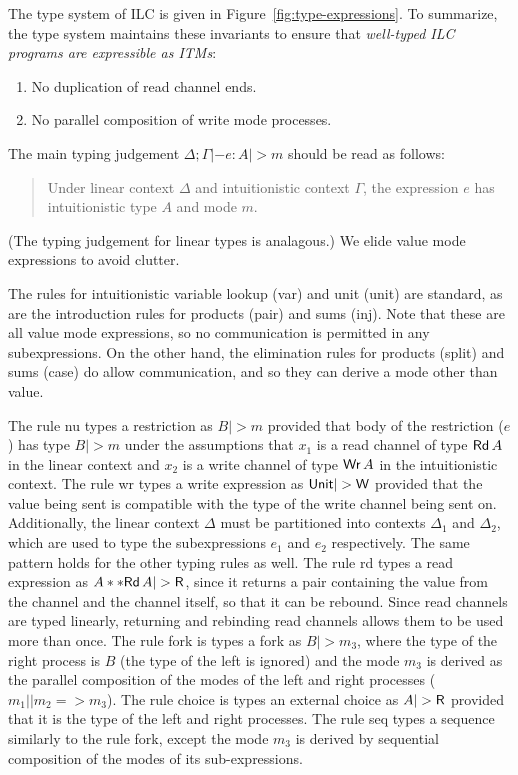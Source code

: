 The type system of ILC is given in Figure~\ref{fig:type-expressions}. To
summarize, the type system maintains these invariants to ensure that
\emph{well-typed ILC programs are expressible as ITMs}:
\begin{enumerate}[leftmargin=*]
  \item No duplication of read channel ends.
  \item No parallel composition of write mode processes.
\end{enumerate}

The main typing judgement $\Delta ; \Gamma |- e : A |> m$ should be read as follows:
\begingroup
\addtolength\leftmargini{-.2in}
\begin{quote}
  Under linear context $\Delta$ and intuitionistic context $\Gamma$, the expression $e$
  has intuitionistic type $A$ and mode $m$.
\end{quote}
\endgroup
\noindent (The typing judgement for linear types is analagous.) We elide value
mode expressions to avoid clutter.

The rules for intuitionistic variable lookup (var) and unit (unit) are standard,
as are the introduction rules for products (pair) and sums (inj). Note that
these are all value mode expressions, so no communication is permitted in any
subexpressions. On the other hand, the elimination rules for products (split)
and sums (case) do allow communication, and so they can derive a mode other than
value.

 The rule nu types a restriction as
$B |> m$ provided that body of the restriction ($e$) has type $B |> m$ under the
assumptions that $x_1$ is a read channel of type $\text{\textsf{Rd}}\,A$ in the linear
context and $x_2$ is a write channel of type $\text{\textsf{Wr}}\,A$ in the intuitionistic
context. The rule wr types a write expression as $\tyUnit |> \Wm$ provided that
the value being sent is compatible with the type of the write channel being sent
on. Additionally, the linear context $\Delta$ must be partitioned into contexts $\Delta_1$
and $\Delta_2$, which are used to type the subexpressions $e_1$ and $e_2$
respectively. The same pattern holds for the other typing rules as well. The rule rd types a read expression as $\tyProd{A}{\tyRd{A}} |> \Rm$, since it
returns a pair containing the value from the channel and the channel itself, so
that it can be rebound. Since read channels are typed linearly, returning and
rebinding read channels allows them to be used more than once. The rule fork is
types a fork as $B |> m_3$, where the type of the right process is $B$ (the type
of the left is ignored) and the mode $m_3$ is derived as the parallel
composition of the modes of the left and right processes ($m_1 || m_2 =>
m_3$). The rule choice is types an external choice as $A |> \Rm$ provided that
it is the type of the left and right processes. The rule seq types a sequence
similarly to the rule fork, except the mode $m_3$ is derived by sequential
composition of the modes of its sub-expressions.

